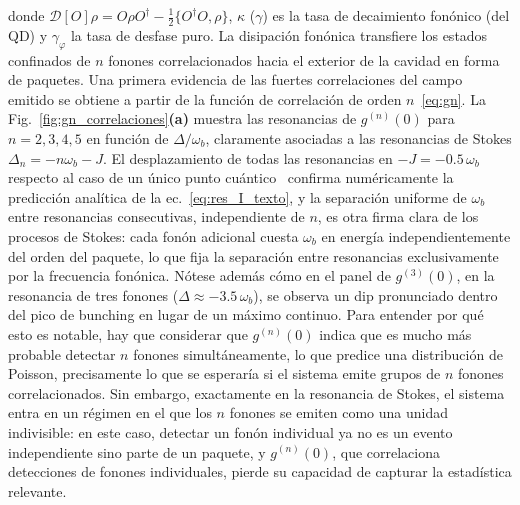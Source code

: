 donde $\mathcal{D}[O]\rho = O\rho O^\dagger - \frac{1}{2}\{O^\dagger O,\rho\}$, $\kappa$ ($\gamma$) es la tasa de decaimiento fonónico (del QD) y $\gamma_\varphi$ la tasa de desfase puro. La disipación fonónica transfiere los estados confinados de $n$ fonones correlacionados hacia el exterior de la cavidad en forma de paquetes. Una primera evidencia de las fuertes correlaciones del campo emitido se obtiene a partir de la función de correlación de orden $n$~\eqref{eq:gn}. La Fig.~\ref{fig:gn_correlaciones}\textbf{(a)} muestra las resonancias de $g^{(n)}(0)$ para $n = 2, 3, 4, 5$ en función de $\Delta/\omega_b$, claramente asociadas a las resonancias de Stokes $\Delta_n = -n\omega_b - J$. El desplazamiento de todas las resonancias en $-J = -0.5\,\omega_b$ respecto al caso de un único punto cuántico~\cite{bin2020} confirma numéricamente la predicción analítica de la ec.~\eqref{eq:res_I_texto}, y la separación uniforme de $\omega_b$ entre resonancias consecutivas, independiente de $n$, es otra firma clara de los procesos de Stokes: cada fonón adicional cuesta $\omega_b$ en energía independientemente del orden del paquete, lo que fija la separación entre resonancias exclusivamente por la frecuencia fonónica. Nótese además cómo en el panel de $g^{(3)}(0)$, en la resonancia de tres fonones ($\Delta \approx -3.5\,\omega_b$), se observa un dip pronunciado dentro del pico de bunching en lugar de un máximo continuo. Para entender por qué esto es notable, hay que considerar que $g^{(n)}(0)$ indica que es mucho más probable detectar $n$ fonones simultáneamente, lo que predice una distribución de Poisson, precisamente lo que se esperaría si el sistema emite grupos de $n$ fonones correlacionados. Sin embargo, exactamente en la resonancia de Stokes, el sistema entra en un régimen en el que los $n$ fonones se emiten como una unidad indivisible: en este caso, detectar un fonón individual ya no es un evento independiente sino parte de un paquete, y $g^{(n)}(0)$, que correlaciona detecciones de fonones individuales, pierde su capacidad de capturar la estadística relevante.

